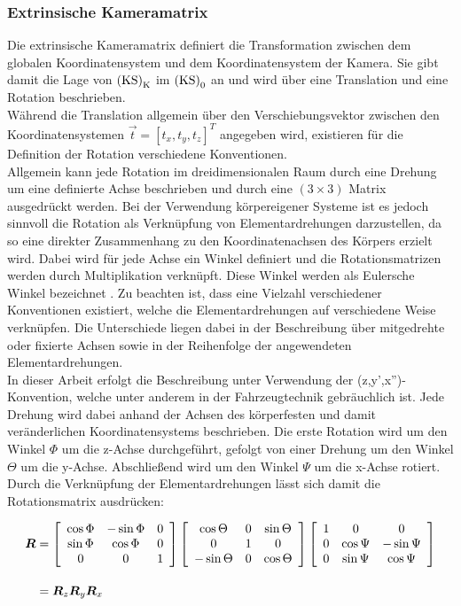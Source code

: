 \subsubsection{Extrinsische Kameramatrix}
Die extrinsische Kameramatrix definiert die Transformation zwischen dem globalen Koordinatensystem und dem Koordinatensystem der Kamera. Sie gibt damit die Lage von ${\mathrm{(KS)}}_{\mathrm{K}}$ im ${\mathrm{(KS)}}_{\mathrm{0}}$ an und wird über eine Translation und eine Rotation beschrieben.\\
Während die Translation allgemein über den Verschiebungsvektor zwischen den Koordinatensystemen $\vec{t} = [t_x, t_y, t_z]^T$ angegeben wird, existieren für die Definition der Rotation verschiedene Konventionen.\\
Allgemein kann jede Rotation im dreidimensionalen Raum durch eine Drehung um eine definierte Achse beschrieben und durch eine $(3 \times 3)$ Matrix ausgedrückt werden. Bei der Verwendung körpereigener Systeme ist es jedoch sinnvoll die Rotation als Verknüpfung von Elementardrehungen darzustellen, da so eine direkter Zusammenhang zu den Koordinatenachsen des Körpers erzielt wird. Dabei wird für jede Achse ein Winkel definiert und die Rotationsmatrizen werden durch Multiplikation verknüpft. Diese Winkel werden als Eulersche Winkel bezeichnet \cite{Foley1990}. Zu beachten ist, dass eine Vielzahl verschiedener Konventionen existiert, welche die Elementardrehungen auf verschiedene Weise verknüpfen. Die Unterschiede liegen dabei in der Beschreibung über mitgedrehte oder fixierte Achsen sowie in der Reihenfolge der angewendeten Elementardrehungen. \\
In dieser Arbeit erfolgt die Beschreibung unter Verwendung der (z,y',x'')-Konvention, welche unter anderem in der Fahrzeugtechnik gebräuchlich ist. Jede Drehung wird dabei anhand der Achsen des körperfesten und damit veränderlichen Koordinatensystems beschrieben. Die erste Rotation wird um den Winkel $\Phi$ um die z-Achse durchgeführt, gefolgt von einer Drehung um den Winkel $\Theta$ um die y-Achse. Abschließend wird um den Winkel $\Psi$ um die x-Achse rotiert. Durch die Verknüpfung der Elementardrehungen lässt sich damit die Rotationsmatrix ausdrücken:

\begin{equation}
\begin{split}
\mbox{\boldmath{$R$}} & = \left[ \begin{array}{ccc}  \cos{\Phi} & -\sin{\Phi} & 0 \\ \sin{\Phi} & \cos{\Phi} & 0 \\ 0 & 0 & 1  \end{array} \right] \left[ \begin{array}{ccc}  \cos{\Theta} & 0 & \sin{\Theta} \\ 0 & 1 & 0 \\ -\sin{\Theta} & 0 & \cos{\Theta}  \end{array} \right] \left[ \begin{array}{ccc}  1 & 0 & 0 \\ 0 & \cos{\Psi} & -\sin{\Psi} \\ 0 & \sin{\Psi} & \cos{\Psi}  \end{array} \right] \\[1em]
& = \mbox{\boldmath{$R$}}_z \mbox{\boldmath{$R$}}_y \mbox{\boldmath{$R$}}_x
\end{split}
\end{equation}

